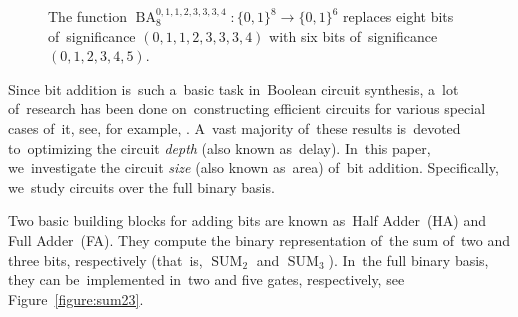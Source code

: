 \documentclass[sigconf, review, anonymous]{acmart}
\DeclareMathOperator{\SUM}{SUM}
\DeclareMathOperator{\BA}{BA}
\begin{document}
\begin{figure}%
	\begin{center}
	\end{center}
	\caption{The function $\BA_8^{0,1,1,2,3,3,3,4} \colon \{0,1\}^8 \to \{0,1\}^6$ replaces eight bits of~significance $(0,1,1,2,3,3,3,4)$ with six bits of~significance $(0,1,2,3,4,5)$.}
	\label{figure:baexample}
\end{figure}

Since bit addition is~such a~basic task in~Boolean circuit synthesis,
a~lot of~research has been done on~constructing efficient circuits
for various special cases of~it, see, for example,
\cite{DBLP:journals/cc/PatersonZ93,
    DBLP:conf/arith/MartelORS95,
    DBLP:journals/tc/StellingMOR98,
    DBLP:conf/arith/BickerstaffSS01}.
A~vast majority of~these results is~devoted to~optimizing the circuit \emph{depth} (also known as~delay).
In~this paper, we~investigate the circuit \emph{size} (also known as~area) of~bit addition. Specifically, we~study circuits over the full binary basis.

Two basic building blocks for adding bits are known as~Half Adder~(HA)
and Full Adder~(FA). They compute the binary representation of~the sum
of~two and three bits, respectively (that~is, $\SUM_2$ and $\SUM_3$).
In~the full binary basis, they can be~implemented in~two and five gates, respectively, see Figure~\ref{figure:sum23}.
\end{document}
